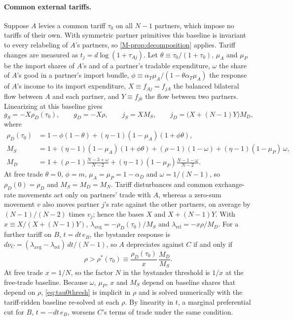 \documentclass[11pt]{article}
\numberwithin{equation}{section}
\theoremstyle{plain}
\begin{document}
\paragraph{Common external tariffs.} Suppose $A$ levies a common tariff $\tau_0$ on all $N-1$ partners, which impose no tariffs of their own. With symmetric partner primitives this baseline is invariant to every relabeling of $A$'s partners, so \cref{M-prop:decomposition} applies. Tariff changes are measured as $t_j=d\log(1+\tau_{Aj})$. Let $\theta\equiv\tau_0/(1+\tau_0)$, $\mu_A$ and $\mu_P$ be the import shares of $A$'s and of a partner's tradable expenditure, $\omega$ the share of $A$'s good in a partner's import bundle, $\phi\equiv\alpha_T\mu_A/(1-\theta\alpha_T\mu_A)$ the response of $A$'s income to its import expenditure, $X\equiv f_{Aj}=f_{jA}$ the balanced bilateral flow between $A$ and each partner, and $Y\equiv f_{jk}$ the flow between two partners. Linearizing at this baseline gives
\begin{equation}
g_S=-X\rho_D(\tau_0),\qquad g_D=-X\rho,\qquad j_S=XM_S,\qquad j_D=\big(X+(N-1)Y\big)M_D,
\end{equation}
where
\begin{align*}
\rho_D(\tau_0)&=1-\phi(1-\theta)+(\eta-1)(1-\mu_A)(1+\phi\theta),\\
M_S&=1+(\eta-1)(1-\mu_A)(1+\phi\theta)+(\rho-1)(1-\omega)+(\eta-1)(1-\mu_P)\,\omega,\\
M_D&=1+(\rho-1)\frac{N-3+\omega}{N-2}+(\eta-1)(1-\mu_P)\frac{N-1-\omega}{N-2}.
\end{align*}
At free trade $\theta=0$, $\phi=m$, $\mu_A=\mu_P=1-\alpha_D$ and $\omega=1/(N-1)$, so $\rho_D(0)=\rho_D$ and $M_S=M_D=M_N$. Tariff disturbances and common exchange-rate movements act only on partners' trade with $A$, whereas a zero-sum movement $v$ also moves partner $j$'s rate against the other partners, on average by $(N-1)/(N-2)$ times $v_j$; hence the bases $X$ and $X+(N-1)Y$. With $x\equiv X/(X+(N-1)Y)$, $\lambda_{\mathrm{avg}}=-\rho_D(\tau_0)/M_S$ and $\lambda_{\mathrm{rel}}=-x\rho/M_D$. For a further tariff on $B$, $t=dt\,e_B$, the bystander response is $d\nu_C=(\lambda_{\mathrm{avg}}-\lambda_{\mathrm{rel}})\,dt/(N-1)$, so $A$ depreciates against $C$ if and only if
\begin{equation}
\rho>\rho^*(\tau_0)\equiv\frac{\rho_D(\tau_0)}{x}\,\frac{M_D}{M_S}.
\label{eq:tau0thresh}
\end{equation}
At free trade $x=1/N$, so the factor $N$ in the bystander threshold is $1/x$ at the free-trade baseline. Because $\omega$, $\mu_P$, $x$ and $M_S$ depend on baseline shares that depend on $\rho$, \cref{eq:tau0thresh} is implicit in $\rho$ and is solved numerically with the tariff-ridden baseline re-solved at each $\rho$. By linearity in $t$, a marginal preferential cut for $B$, $t=-dt\,e_B$, worsens $C$'s terms of trade under the same condition.
\end{document}
